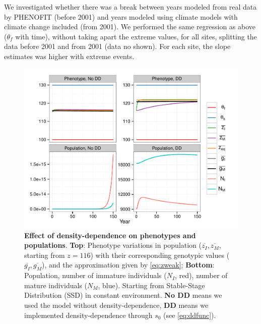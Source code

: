 We investigated whether there was a break between years modeled from real data by \textsc{PHENOFIT} (before 2001) and years modeled using climate models with climate change included (from 2001). We performed the same regression as above ($\theta_f$ with time), without taking apart the extreme values, for all sites, splitting the data before 2001 and from 2001 (data no shown). For each site, the slope estimates was higher with extreme events.

\begin{figure}[ht!]
	\centering
	\includegraphics[scale=1]{Figures/DDphenopop.pdf}
	\caption{\textbf{Effect of density-dependence on phenotypes and populations}. \textbf{Top}: Phenotype variations in population ($\overline{z_I}, \overline{z_M}$, starting from $z = 116$) with their corresponding genotypic values ($\overline{g_I}, \overline{g_M}$), and the approximation given by \autoref{eq:zweak}; \textbf{Bottom}: Population, number of immature individuals ($N_I$, red), number of mature individuals ($N_M$, blue). Starting from Stable-Stage Distribution (SSD) in constant environment. \textbf{No DD} means we used the model without density-dependence, \textbf{DD} means we implemented density-dependence through $s_0$ (see \autoref{eq:ddfunc}).}
	\label{fig:dd}
\end{figure}

